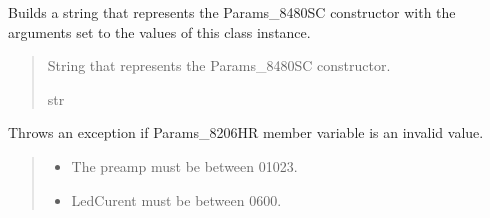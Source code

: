 \documentclass[letterpaper,10pt,english]{sphinxmanual}
\begin{document}
\begin{fulllineitems}
\begin{fulllineitems}
\begin{quote}
\begin{description}
\end{description}\end{quote}

\end{fulllineitems}


\begin{fulllineitems}
\label{\detokenize{Setup_PodParameters:Setup_PodParameters.Params_8480SC.GetInit}}
\pysigstartsignatures
{}
\pysigstopsignatures
\sphinxAtStartPar
Builds a string that represents the Params\_8480SC constructor with the         arguments set to the values of this class instance.
\begin{quote}\begin{description}
\sphinxAtStartPar
String that represents the Params\_8480SC constructor.

\sphinxAtStartPar
str

\end{description}\end{quote}

\end{fulllineitems}


\begin{fulllineitems}
\label{\detokenize{Setup_PodParameters:Setup_PodParameters.Params_8480SC._CheckParams}}
\pysigstartsignatures
{}
\pysigstopsignatures
\sphinxAtStartPar
Throws an exception if Params\_8206HR member variable is an invalid value.
\begin{quote}\begin{description}
\begin{itemize}
\item {} 
\sphinxAtStartPar
{} \textendash{} The preamp must be between 0\sphinxhyphen{}1023.

\item {} 
\sphinxAtStartPar
{} \textendash{} Led\sphinxhyphen{}Curent must be between 0\sphinxhyphen{}600.


\end{itemize}
\end{description}
\end{quote}
\end{fulllineitems}
\end{fulllineitems}
\end{document}
